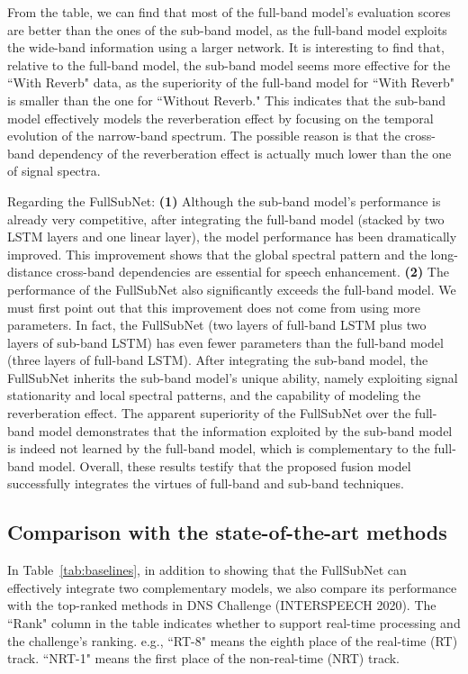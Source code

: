 \documentclass{article}
\begin{document}
From the table, we can find that most of the full-band model's evaluation scores are better than the ones of the sub-band model, as the full-band model exploits the wide-band information using a larger network. It is interesting to find that, relative to the full-band model, the sub-band model seems more effective for the ``With Reverb" data, as the superiority of the full-band model for ``With Reverb" is smaller than the one for ``Without Reverb." This indicates that the sub-band model effectively models the reverberation effect by focusing on the temporal evolution of the narrow-band spectrum. The possible reason is that the cross-band dependency of the reverberation effect is actually much lower than the one of signal spectra.

Regarding the FullSubNet: 
\textbf{(1)} Although the sub-band model's performance is already very competitive, after integrating the full-band model (stacked by two LSTM layers and one linear layer), the model performance has been dramatically improved. This improvement shows that the global spectral pattern and the long-distance cross-band dependencies are essential for speech enhancement.
\textbf{(2)} The performance of the FullSubNet also significantly exceeds the full-band model. We must first point out that this improvement does not come from using more parameters. In fact, the FullSubNet (two layers of full-band LSTM plus two layers of sub-band LSTM) has even fewer parameters than the full-band model (three layers of full-band LSTM). After integrating the sub-band model, the FullSubNet inherits the sub-band model's unique ability, namely exploiting signal stationarity and local spectral patterns, and the capability of modeling the reverberation effect.
The apparent superiority of the FullSubNet over the full-band model demonstrates that the information exploited by the sub-band model is indeed not learned by the full-band model, which is complementary to the full-band model. Overall, these results testify that the proposed fusion model successfully integrates the virtues of full-band and sub-band techniques.

\subsection{Comparison with the state-of-the-art methods}

In Table~\ref{tab:baselines}, in addition to showing that the FullSubNet can effectively integrate two complementary models, we also compare its performance with the top-ranked methods in DNS Challenge (INTERSPEECH 2020). 
The ``Rank" column in the table indicates whether to support real-time processing and the challenge's ranking.
e.g., ``RT-8" means the eighth place of the real-time (RT) track. ``NRT-1" means the first place of the non-real-time (NRT) track.
\end{document}
